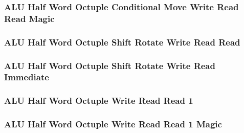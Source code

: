 \subsubsection[{\small ALU Half Word Octuple Conditional Move Write Read Read Magic}]{ALU Half Word Octuple Conditional Move Write Read Read Magic} \label{sec:format-ALU-HOCMWRR.M}



\subsubsection[{\small ALU Half Word Octuple Shift Rotate Write Read Read}]{ALU Half Word Octuple Shift Rotate Write Read Read} \label{sec:format-ALU-HOSWRR}



\subsubsection[{\small ALU Half Word Octuple Shift Rotate Write Read Immediate}]{ALU Half Word Octuple Shift Rotate Write Read Immediate} \label{sec:format-ALU-HOSWRI}



\subsubsection[{\small ALU Half Word Octuple Write Read Read 1}]{ALU Half Word Octuple Write Read Read 1} \label{sec:format-ALU-HOWRR1}



\subsubsection[{\small ALU Half Word Octuple Write Read Read 1 Magic}]{ALU Half Word Octuple Write Read Read 1 Magic} \label{sec:format-ALU-HOWRR1.M}



